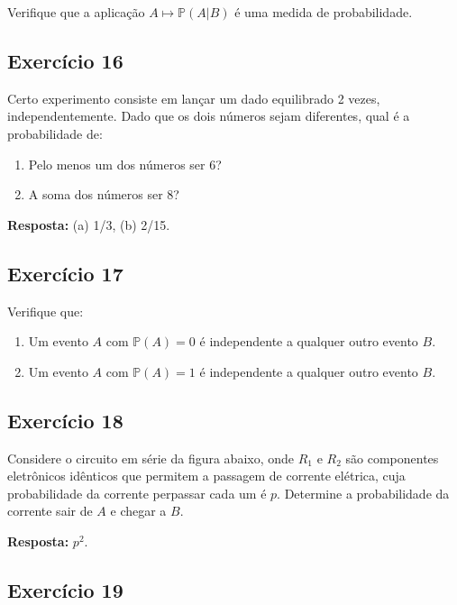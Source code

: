 \documentclass[
  letterpaper,
  DIV=11,
  numbers=noendperiod]{scrartcl}
\begin{document}
Verifique que a aplicação \(A \mapsto \mathbb{P}(A|B)\) é uma medida de
probabilidade.

\hypertarget{exercuxedcio-16}{%
\subsection{Exercício 16}\label{exercuxedcio-16}}

Certo experimento consiste em lançar um dado equilibrado 2 vezes,
independentemente. Dado que os dois números sejam diferentes, qual é a
probabilidade de:

\begin{enumerate}
\def\labelenumi{(\alph{enumi})}
\item
  Pelo menos um dos números ser 6?
\item
  A soma dos números ser 8?
\end{enumerate}

\textbf{Resposta:} (a) 1/3, (b) 2/15.

\hypertarget{exercuxedcio-17}{%
\subsection{Exercício 17}\label{exercuxedcio-17}}

Verifique que:

\begin{enumerate}
\def\labelenumi{(\alph{enumi})}
\item
  Um evento \(A\) com \(\mathbb{P}(A) = 0\) é independente a qualquer
  outro evento \(B\).
\item
  Um evento \(A\) com \(\mathbb{P}(A) = 1\) é independente a qualquer
  outro evento \(B\).
\end{enumerate}

\hypertarget{exercuxedcio-18}{%
\subsection{Exercício 18}\label{exercuxedcio-18}}

Considere o circuito em série da figura abaixo, onde \(R_1\) e \(R_2\)
são componentes eletrônicos idênticos que permitem a passagem de
corrente elétrica, cuja probabilidade da corrente perpassar cada um é
\(p\). Determine a probabilidade da corrente sair de \(A\) e chegar a
\(B\).

\textbf{Resposta:} \(p^2\).

\hypertarget{exercuxedcio-19}{%
\subsection{Exercício 19}\label{exercuxedcio-19}}
\end{document}
